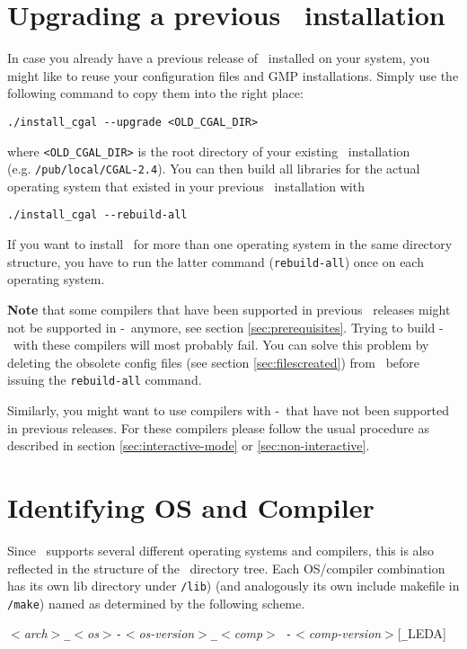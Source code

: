 \section{Upgrading a previous \cgal\ installation}
\label{sec:upgrade}

In case you already have a previous release of \cgal\ installed on
your system, you might like to reuse your configuration files and GMP
installations. Simply use the following command to copy them into the
right place:
\begin{verbatim}
./install_cgal --upgrade <OLD_CGAL_DIR>
\end{verbatim}
where \texttt{<OLD\_CGAL\_DIR>} is the root directory of your existing
\cgal\ installation\\ (e.g. \texttt{/pub/local/CGAL-2.4}).  You can
then build all libraries for the actual operating system that existed
in your previous \cgal\ installation with
\begin{verbatim}
./install_cgal --rebuild-all
\end{verbatim}

If you want to install \cgal\ for more than one operating system in
the same directory structure, you have to run the latter command
(\texttt{rebuild-all}) once on each operating system.

\textbf{Note} that some compilers that have been supported in previous
\cgal\ releases might not be supported in \cgal-\cgalrelease\ anymore,
see section \ref{sec:prerequisites}. Trying to build
\cgal-\cgalrelease\ with these compilers will most probably fail. You
can solve this problem by deleting the obsolete config files (see
section \ref{sec:filescreated}) from \cgalinstconfdir\ before issuing
the \texttt{rebuild-all} command.

Similarly, you might want to use compilers with \cgal-\cgalrelease\ 
that have not been supported in previous releases. For these compilers
please follow the usual procedure as described in section
\ref{sec:interactive-mode} or \ref{sec:non-interactive}.

\section{Identifying OS and Compiler}\label{sec:os-compiler-id}

Since \cgal\ supports several different operating systems and
compilers, this is also reflected in the structure of the \cgal\ 
directory tree. Each OS/compiler combination has its own lib directory
under \texttt{\cgaldir/lib}) (and analogously its own include
makefile\index{include makefile} in \texttt{\cgaldir/make}) named as
determined by the following scheme.
\begin{center}
  \textit{$<$arch$>$\texttt{\_}$<$os$>$\texttt{-}$<$os-version$>$\texttt{\_}$<$comp$>${\tt
    -}$<$comp-version$>$}[\texttt{\_}LEDA]
\end{center}

